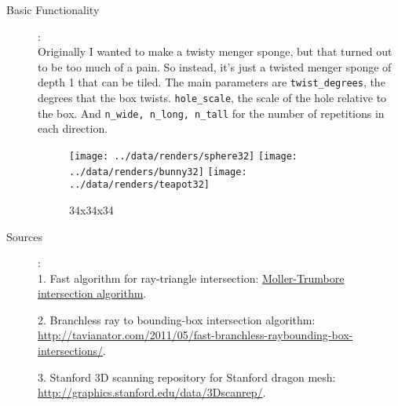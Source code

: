 \documentclass {article}
\begin{document}
	\newpage
	\begin{description}
		\item[Basic Functionality]:\\
		
		Originally I wanted to make a twisty menger sponge, but that turned out to be too much of a pain. So instead, it's just a twisted menger sponge of depth 1 that can be tiled. The main parameters are \texttt{twist\_degrees}, the degrees that the box twists. \texttt{hole\_scale}, the scale of the hole relative to the box. And \texttt{n\_wide, n\_long, n\_tall} for the number of repetitions in each direction.
		
		\begin{figure*}[ht!]
			\texttt{[image: ../data/renders/sphere32]}\hfill
			\texttt{[image: ../data/renders/bunny32]}\hfill
			\texttt{[image: ../data/renders/teapot32]}
			\caption{34x34x34}
		\end{figure*}
		
		\newpage

		\item[Sources]:\\
		
		1. Fast algorithm for ray-triangle intersection: \href{http://en.wikipedia.org/wiki/M%C3%B6ller%E2%80%93Trumbore_intersection_algorithm}{Moller-Trumbore intersection algorithm}. 
		
		2. Branchless ray to bounding-box intersection algorithm: \href{http://tavianator.com/2011/05/fast-branchless-raybounding-box-intersections/}{http://tavianator.com/2011/05/fast-branchless-raybounding-box-intersections/}.  
		
		3. Stanford 3D scanning repository for Stanford dragon mesh: \href{http://graphics.stanford.edu/data/3Dscanrep/}{http://graphics.stanford.edu/data/3Dscanrep/}. 
		
	\end{description}
	
\end{document}

